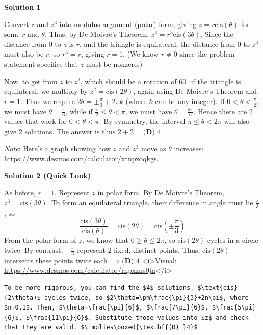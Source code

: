\begin{enumerate}
\textbf{Solution 1}

Convert $z$ and $z^3$ into modulus-argument (polar) form, giving $z=r\text{cis}(\theta)$ for some $r$ and $\theta$. Thus, by De Moivre's Theorem, $z^3=r^3\text{cis}(3\theta)$. Since the distance from $0$ to $z$ is $r$, and the triangle is equilateral, the distance from $0$ to $z^3$ must also be $r$, so $r^3=r$, giving $r=1$. (We know $r \neq 0$ since the problem statement specifies that $z$ must be nonzero.)

 Now, to get from $z$ to $z^3$, which should be a rotation of $60^{\circ}$ if the triangle is equilateral, we multiply by $z^2 = \text{cis}(2\theta)$, again using De Moivre's Theorem and $r=1$. Thus we require $2\theta=\pm\frac{\pi}{3} + 2\pi k$ (where $k$ can be any integer). If $0 < \theta < \frac{\pi}{2}$, we must have $\theta=\frac{\pi}{6}$, while if $\frac{\pi}{2} \leq \theta < \pi$, we must have $\theta = \frac{5\pi}{6}$. Hence there are $2$ values that work for $0 < \theta < \pi$. By symmetry, the interval $\pi \leq \theta < 2\pi$ will also give $2$ solutions. The answer is thus $2 + 2 = \boxed{\textbf{(D) }4}$.

 \textit{Note}: Here's a graph showing how $z$ and $z^3$ move as $\theta$ increases: \href{https://www.desmos.com/calculator/xtnpzoqkgs}{https://www.desmos.com/calculator/xtnpzoqkgs}.

 



\textbf{Solution 2 (Quick Look)}

As before, $r=1$. Represent $z$ in polar form. By De Moivre's Theorem, $z^3=\text{cis}(3\theta)$. To form an equilateral triangle, their difference in angle must be $\frac{\pi}{3}$, so 
 \[\frac{\text{cis}(3\theta)}{\text{cis}(\theta)}=\text{cis}(2\theta)=\text{cis}(\pm\frac{\pi}{3})\] From the polar form of $z$, we know that $0\geq\theta\leq2\pi$, so $\text{cis}(2\theta)$ cycles in a circle twice. By contrast, $\pm\frac{\pi}{3}$ represent $2$ fixed, distinct points. Thus, $\text{cis}(2\theta)$ intersects these points twice each$\implies\boxed{\textbf{(D) }4}$
<i>Visual: \href{https://www.desmos.com/calculator/rnpxzns0jn}{https://www.desmos.com/calculator/rnpxzns0jn}</i>
\begin{verbatim}
To be more rigorous, you can find the $4$ solutions. $\text{cis}(2\theta)$ cycles twice, so $2\theta=\pm\frac{\pi}{3}+2n\pi$, where $n=0,1$. Then, $\theta=\frac{\pi}{6}$, $\frac{7\pi}{6}$, $\frac{5\pi}{6}$, $\frac{11\pi}{6}$. Substitute those values into $z$ and check that they are valid. $\implies\boxed{\textbf{(D) }4}$
\end{verbatim}


\end{enumerate}
